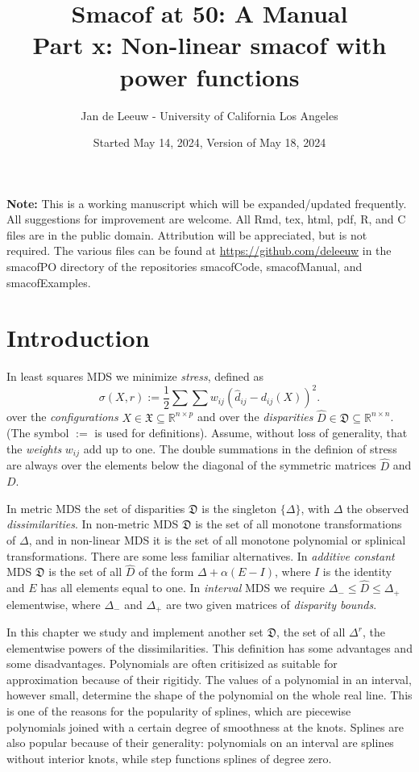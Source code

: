 \documentclass[
  12pt,
]{article}
\title{Smacof at 50: A Manual\\
Part x: Non-linear smacof with power functions}
\author{Jan de Leeuw - University of California Los Angeles}
\date{Started May 14, 2024, Version of May 18, 2024}
\begin{document}
\maketitle

{
\setcounter{tocdepth}{3}
\tableofcontents
}
\textbf{Note:} This is a working manuscript which will be expanded/updated
frequently. All suggestions for improvement are welcome. All Rmd, tex,
html, pdf, R, and C files are in the public domain. Attribution will be
appreciated, but is not required. The various files can be found at
\url{https://github.com/deleeuw} in the smacofPO directory of the repositories smacofCode, smacofManual, and smacofExamples.

\section{Introduction}\label{introduction}

In least squares MDS we minimize \emph{stress}, defined as
\begin{equation}
\sigma(X, r):=\frac12\sum\sum w_{ij}(\hat d_{ij}-d_{ij}(X))^2.
\label{eq:stressdef}
\end{equation}
over the \emph{configurations} \(X\in\mathfrak{X}\subseteq\mathbb{R}^{n\times p}\) and over the \emph{disparities} \(\hat D\in\mathfrak{D}\subseteq\mathbb{R}^{n\times n}\).
(The symbol \(:=\) is used for definitions). Assume, without loss of generality,
that the \emph{weights} \(w_{ij}\) add up to one. The double summations in the
definion of stress are always over the elements below the diagonal of the
symmetric matrices \(\hat D\) and \(D\).

In metric MDS the set of disparities \(\mathfrak{D}\) is the singleton \(\{\Delta\}\), with \(\Delta\) the
observed \emph{dissimilarities}. In non-metric MDS \(\mathfrak{D}\) is the set of all
monotone transformations of \(\Delta\), and in non-linear MDS it is the set of all
monotone polynomial or splinical transformations. There are some less familiar alternatives. In \emph{additive constant} MDS \(\mathfrak{D}\) is the set of all
\(\hat D\) of the form \(\Delta+\alpha(E-I)\), where \(I\) is the identity and
\(E\) has all elements equal to one. In \emph{interval} MDS we require
\(\Delta_-\leq\hat D\leq\Delta_+\) elementwise, where \(\Delta_-\) and
\(\Delta_+\) are two given matrices of \emph{disparity bounds}.

In this chapter we study and implement another set \(\mathfrak{D}\),
the set of all \(\Delta^r\), the elementwise powers of the dissimilarities.
This definition has some advantages and some disadvantages. Polynomials are often critisized as suitable for approximation because of their rigitidy. The values of
a polynomial in an interval, however small, determine the shape of the
polynomial on the whole real line. This is one of the reasons for the
popularity of splines, which are piecewise polynomials joined with a certain degree of smoothness at the knots. Splines are also popular because of their generality:
polynomials on an interval are splines without interior knots, while step functions splines of degree zero.
\end{document}
